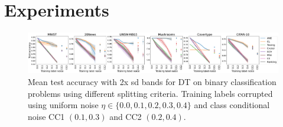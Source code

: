 \documentclass[letterpaper]{article} %
\newcommand{\bp}{{\bm{p}}}
\newcommand{\by}{{\bm{y}}}
\newcommand{\cS}{{\cal{S}}}
\newcommand{\cD}{{\cal{D}}}
\newcommand{\NE}{\mathrm{NE}}
\begin{document}




\section{Experiments}
\label{sec:experiments}

\begin{figure}[h!]
    \centering
    \includegraphics[width=0.97\linewidth]{figs/binary_classification,DT_classfier.pdf}
    \caption{
    Mean test accuracy with 2x sd bands for DT on binary classification problems using different splitting criteria.
    Training labels corrupted using uniform noise $\eta\in\{0.0, 0.1,0.2,0.3,0.4\}$ and class conditional noise CC1 $(0.1,0.3)$ and CC2 $(0.2,0.4)$.
    }
    \label{fig:dt-bin}
\end{figure}
\end{document}
